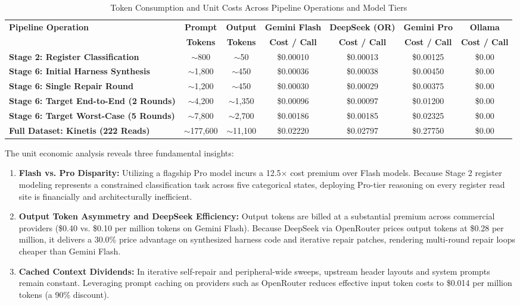 \documentclass[11pt,a4paper]{article}
\begin{document}
\begin{table}[htbp]
\centering
\footnotesize
\setlength{\tabcolsep}{3.5pt}
\caption{Token Consumption and Unit Costs Across Pipeline Operations and Model Tiers}
\label{tab:cost_breakdown}
\begin{tabularx}{\textwidth}{>{\raggedright\arraybackslash}X cccccc}
\toprule
\textbf{Pipeline Operation} & \textbf{Prompt} & \textbf{Output} & \textbf{Gemini Flash} & \textbf{DeepSeek (OR)} & \textbf{Gemini Pro} & \textbf{Ollama} \\
 & \textbf{Tokens} & \textbf{Tokens} & \textbf{Cost / Call} & \textbf{Cost / Call} & \textbf{Cost / Call} & \textbf{Cost / Call} \\
\midrule
\textbf{Stage 2: Register Classification} & $\sim$800 & $\sim$50 & \$0.00010 & \$0.00013 & \$0.00125 & \$0.00 \\
\textbf{Stage 6: Initial Harness Synthesis} & $\sim$1,800 & $\sim$450 & \$0.00036 & \$0.00038 & \$0.00450 & \$0.00 \\
\textbf{Stage 6: Single Repair Round} & $\sim$1,200 & $\sim$450 & \$0.00030 & \$0.00029 & \$0.00375 & \$0.00 \\
\textbf{Stage 6: Target End-to-End (2 Rounds)} & $\sim$4,200 & $\sim$1,350 & \$0.00096 & \$0.00097 & \$0.01200 & \$0.00 \\
\textbf{Stage 6: Target Worst-Case (5 Rounds)} & $\sim$7,800 & $\sim$2,700 & \$0.00186 & \$0.00185 & \$0.02325 & \$0.00 \\
\textbf{Full Dataset: Kinetis (222 Reads)} & $\sim$177,600 & $\sim$11,100 & \$0.02220 & \$0.02797 & \$0.27750 & \$0.00 \\
\bottomrule
\end{tabularx}
\end{table}

The unit economic analysis reveals three fundamental insights:
\begin{enumerate}[leftmargin=1.8em, itemsep=0.2em]
    \item \textbf{Flash vs. Pro Disparity:} Utilizing a flagship Pro model incurs a 12.5$\times$ cost premium over Flash models. Because Stage 2 register modeling represents a constrained classification task across five categorical states, deploying Pro-tier reasoning on every register read site is financially and architecturally inefficient.
    \item \textbf{Output Token Asymmetry and DeepSeek Efficiency:} Output tokens are billed at a substantial premium across commercial providers (\$0.40 vs. \$0.10 per million tokens on Gemini Flash). Because DeepSeek via OpenRouter prices output tokens at \$0.28 per million, it delivers a 30.0\% price advantage on synthesized harness code and iterative repair patches, rendering multi-round repair loops cheaper than Gemini Flash.
    \item \textbf{Cached Context Dividends:} In iterative self-repair and peripheral-wide sweeps, upstream header layouts and system prompts remain constant. Leveraging prompt caching on providers such as OpenRouter reduces effective input token costs to \$0.014 per million tokens (a 90\% discount).
\end{enumerate}
\end{document}
